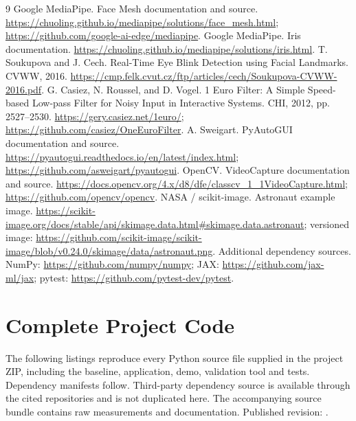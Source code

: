 \documentclass[10pt,twocolumn,letterpaper]{article}
\begin{document}
\begin{thebibliography}{9}
 Google MediaPipe. Face Mesh documentation and source. \url{https://chuoling.github.io/mediapipe/solutions/face_mesh.html}; \url{https://github.com/google-ai-edge/mediapipe}.
 Google MediaPipe. Iris documentation. \url{https://chuoling.github.io/mediapipe/solutions/iris.html}.
 T. Soukupova and J. Cech. Real-Time Eye Blink Detection using Facial Landmarks. CVWW, 2016. \url{https://cmp.felk.cvut.cz/ftp/articles/cech/Soukupova-CVWW-2016.pdf}.
 G. Casiez, N. Roussel, and D. Vogel. 1 Euro Filter: A Simple Speed-based Low-pass Filter for Noisy Input in Interactive Systems. CHI, 2012, pp. 2527--2530. \url{https://gery.casiez.net/1euro/}; \url{https://github.com/casiez/OneEuroFilter}.
 A. Sweigart. PyAutoGUI documentation and source. \url{https://pyautogui.readthedocs.io/en/latest/index.html}; \url{https://github.com/asweigart/pyautogui}.
 OpenCV. VideoCapture documentation and source. \url{https://docs.opencv.org/4.x/d8/dfe/classcv_1_1VideoCapture.html}; \url{https://github.com/opencv/opencv}.
 NASA / scikit-image. Astronaut example image. \url{https://scikit-image.org/docs/stable/api/skimage.data.html#skimage.data.astronaut}; versioned image: \url{https://github.com/scikit-image/scikit-image/blob/v0.24.0/skimage/data/astronaut.png}.
 Additional dependency sources. NumPy: \url{https://github.com/numpy/numpy}; JAX: \url{https://github.com/jax-ml/jax}; pytest: \url{https://github.com/pytest-dev/pytest}.
\end{thebibliography}

\clearpage\onecolumn\appendix
\section{Complete Project Code}
The following listings reproduce every Python source file supplied in the project ZIP, including the baseline, application, demo, validation tool and tests. Dependency manifests follow. Third-party dependency source is available through the cited repositories and is not duplicated here. The accompanying source bundle contains raw measurements and documentation. Published revision: \FinalRepo.

\end{document}
